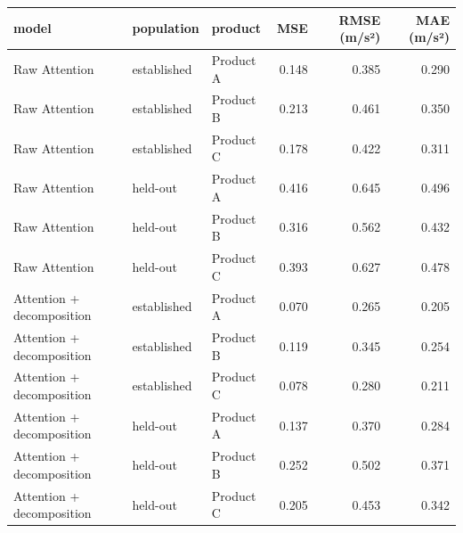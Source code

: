 \begin{tabular}{lllrrr}
\toprule
model & population & product & MSE & RMSE (m/s²) & MAE (m/s²) \\
\midrule
Raw Attention & established & Product A & 0.148 & 0.385 & 0.290 \\
Raw Attention & established & Product B & 0.213 & 0.461 & 0.350 \\
Raw Attention & established & Product C & 0.178 & 0.422 & 0.311 \\
Raw Attention & held-out & Product A & 0.416 & 0.645 & 0.496 \\
Raw Attention & held-out & Product B & 0.316 & 0.562 & 0.432 \\
Raw Attention & held-out & Product C & 0.393 & 0.627 & 0.478 \\
Attention + decomposition & established & Product A & 0.070 & 0.265 & 0.205 \\
Attention + decomposition & established & Product B & 0.119 & 0.345 & 0.254 \\
Attention + decomposition & established & Product C & 0.078 & 0.280 & 0.211 \\
Attention + decomposition & held-out & Product A & 0.137 & 0.370 & 0.284 \\
Attention + decomposition & held-out & Product B & 0.252 & 0.502 & 0.371 \\
Attention + decomposition & held-out & Product C & 0.205 & 0.453 & 0.342 \\
\bottomrule
\end{tabular}
